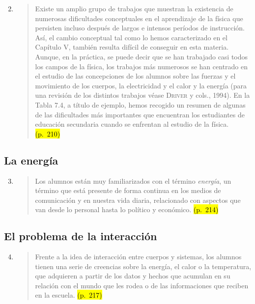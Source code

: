 \documentclass{article}
\begin{document}
\begin{enumerate}
  \setcounter{enumi}{1}
\item
\begin{quote}
Existe un amplio grupo de trabajos que muestran la existencia de numerosas dificultades conceptuales en el aprendizaje de la física que persisten incluso después de largos e intensos períodos de instrucción. Así, el cambio conceptual tal como lo hemos caracterizado en el Capítulo V, también resulta difícil de conseguir en esta materia. Aunque, en la práctica, se puede decir que se han trabajado casi todos los campos de la física, los trabajos más numerosos se han centrado en el estudio de las concepciones de los alumnos sobre las fuerzas y el movimiento de los cuerpos, la electricidad y el calor y la energía (para una revisión de los distintos trabajos véase \textsc{Driver} y cols., 1994). En la Tabla 7.4, a título de ejemplo, hemos recogido un resumen de algunas de las dificultades más importantes que encuentran los estudiantes de educación secundaria cuando se enfrentan al estudio de la física. \hl{(p.~210)}
\end{quote}
\end{enumerate}

\subsection*{La energía}

\begin{enumerate}
  \setcounter{enumi}{2}
  \item
  \begin{quote}
  Los alumnos están muy familiarizados con el término \textit{energía}, un término que está presente de forma continua en los medios de comunicación y en nuestra vida diaria, relacionado con aspectos que van desde lo personal hasta lo político y económico. \hl{(p.~214)}
  \end{quote}
\end{enumerate}

\subsection*{El problema de la interacción}

\begin{enumerate}
  \setcounter{enumi}{3}
  \item
  \begin{quote}
  Frente a la idea de interacción entre cuerpos y sistemas, los alumnos tienen una serie de creencias sobre la energía, el calor o la temperatura, que adquieren a partir de los datos y hechos que acumulan en su relación con el mundo que les rodea o de las informaciones que reciben en la escuela. \hl{(p.~217)}
  \end{quote}
\end{enumerate}
\end{document}
